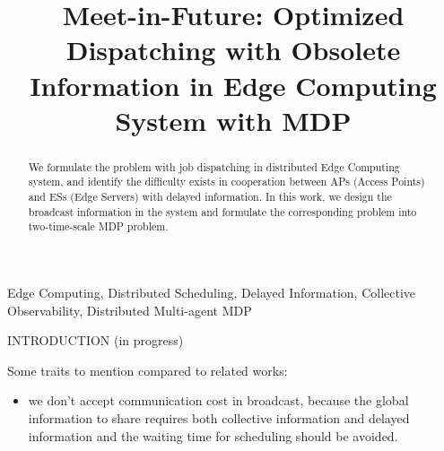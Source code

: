 \documentclass[10pt, conference, letterpaper]{IEEEtran}
\begin{document}
    \title{
        Meet-in-Future: Optimized Dispatching with Obsolete Information in Edge Computing System with MDP
    }
    \author{
    }
    \maketitle

    \begin{abstract}
        \label{sec:abstract}
        We formulate the problem with job dispatching in distributed Edge Computing system, and identify the difficulty exists in cooperation between APs (Access Points) and ESs (Edge Servers) with delayed information. In this work, we design the broadcast information in the system and formulate the corresponding problem into two-time-scale MDP problem.
    \end{abstract}

    \begin{IEEEkeywords}
        Edge Computing, Distributed Scheduling, Delayed Information, Collective Observability, Distributed Multi-agent MDP
    \end{IEEEkeywords}

    \begin{section}{INTRODUCTION}
        \label{sec:introduction}
        (in progress)

        Some traits to mention compared to related works:
        \begin{itemize}
            \item we don't accept communication cost in broadcast, because the global information to share requires both collective information and delayed information and the waiting time for scheduling should be avoided.
        \end{itemize}
    \end{section}
\end{document}
